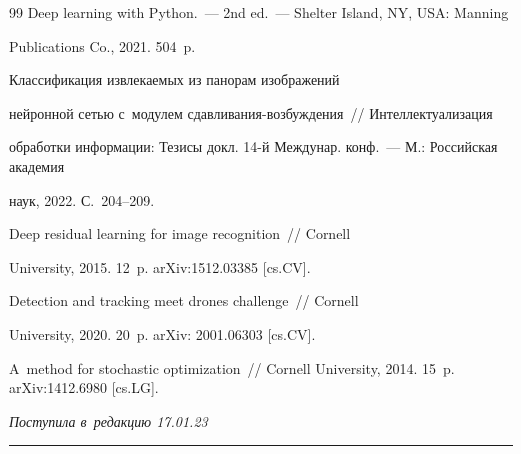 {{\begin{thebibliography}{99}
 Deep learning with Python.~--- 2nd ed.~--- Shelter Island, NY, USA: Manning 


Publications Co., 2021. 504~p.




 Классификация извлекаемых из панорам изображений 


нейронной сетью с~модулем сдав\-ли\-ва\-ния-воз\-буж\-де\-ния~/\!\!/ Интеллектуализация 


обработки информации: Тезисы докл. 14-й Междунар. конф.~--- М.: Российская академия 


наук, 2022. С.~204--209.




 Deep residual learning for image recognition~/\!\!/ Cornell 


University, 2015. 12~p. arXiv:1512.03385 [cs.CV].




 Detection and tracking meet drones challenge~/\!\!/ Cornell 


University, 2020.  20~p. arXiv: 2001.06303 [cs.CV].




 A~method for stochastic optimization~/\!\!/ Cornell University,  2014.  15~p. arXiv:1412.6980 [cs.LG].





 \end{thebibliography}


} }











\vspace*{-6pt}





\hfill{\small\textit{Поступила в~редакцию 17.01.23}}





\vspace*{8pt}





\hrule





